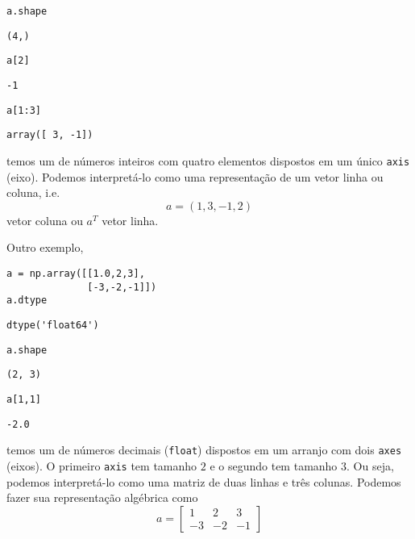 \begin{lstlisting}
a.shape
\end{lstlisting}

\begin{verbatim}
(4,)
\end{verbatim}

\begin{lstlisting}
a[2]
\end{lstlisting}

\begin{verbatim}
-1
\end{verbatim}

\begin{lstlisting}
a[1:3]
\end{lstlisting}

\begin{verbatim}
array([ 3, -1])
\end{verbatim}

temos um {\PYTHONnumpyDOTarray} de números inteiros com quatro elementos dispostos em um único \texttt{axis} (eixo). Podemos interpretá-lo como uma representação de um vetor linha ou coluna, i.e.
\begin{equation}
  a = (1, 3, -1, 2)
\end{equation}
vetor coluna ou $a^T$ vetor linha.

Outro exemplo,

\begin{lstlisting}
a = np.array([[1.0,2,3],
              [-3,-2,-1]])
a.dtype
\end{lstlisting}

\begin{verbatim}
dtype('float64')
\end{verbatim}

\begin{lstlisting}
a.shape
\end{lstlisting}

\begin{verbatim}
(2, 3)
\end{verbatim}

\begin{lstlisting}
a[1,1]
\end{lstlisting}

\begin{verbatim}
-2.0
\end{verbatim}

temos um {\PYTHONnumpyDOTarray} de números decimais (\texttt{float}) dispostos em um arranjo com dois \texttt{axes} (eixos). O primeiro \texttt{axis} tem tamanho $2$ e o segundo tem tamanho $3$. Ou seja, podemos interpretá-lo como uma matriz de duas linhas e três colunas. Podemos fazer sua representação algébrica como
\begin{equation}
  a =
  \begin{bmatrix}
    1 & 2 & 3\\
    -3 & -2 & -1 
  \end{bmatrix}
\end{equation}

